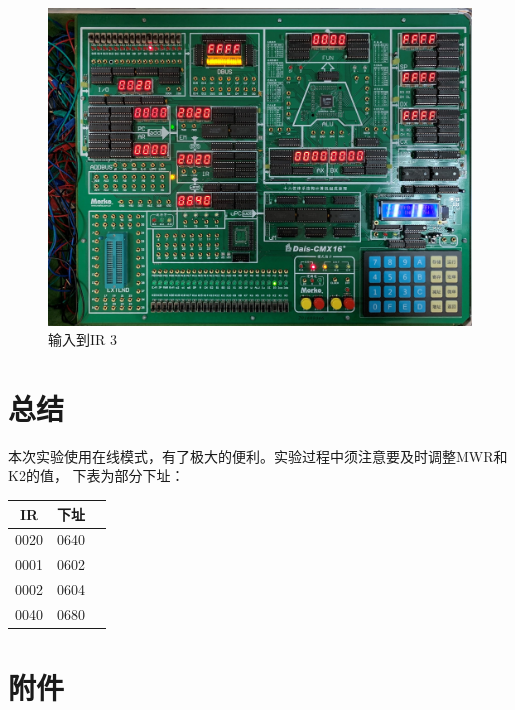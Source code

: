 \documentclass[a4paper,10pt,UTF8]{paper}
\numberwithin{equation}{section}
\numberwithin{figure}{section}
\begin{document}
\begin{figure}[h]
  \centering
  \includegraphics[width=0.9\linewidth]{5.jpg}
  \caption{输入到IR 3}
  \label{fig:5}
\end{figure}


\section{总结}

本次实验使用在线模式，有了极大的便利。实验过程中须注意要及时调整MWR和K2的值，
下表为部分下址：

\begin{tabular}{|c|c|c|}
  \hline 
  IR & 下址 \\ \hline
  0020 & 0640 \\ \hline
  0001 & 0602 \\ \hline
  0002 & 0604 \\ \hline
  0040 & 0680 \\ \hline
  
\end{tabular}

\section{附件}
\end{document}

